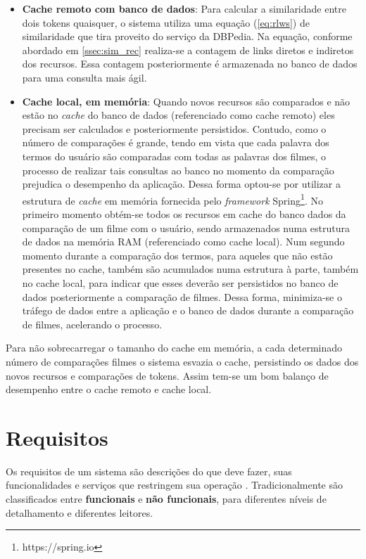 \begin{itemize}
	\item{\textbf{Cache remoto com banco de dados}: Para calcular a similaridade entre dois tokens quaisquer, o sistema utiliza uma equação (\ref{eq:rlws}) de similaridade que tira proveito do serviço da DBPedia. Na equação, conforme abordado em \ref{ssec:sim_rec} realiza-se a contagem de links diretos e indiretos dos recursos. Essa contagem posteriormente é armazenada no banco de dados para uma consulta mais ágil.}
	\item{\textbf{Cache local, em memória}: Quando novos recursos são comparados e não estão no \textit{cache} do banco de dados (referenciado como cache remoto) eles precisam ser calculados e posteriormente persistidos. Contudo, como o número de comparações é grande, tendo em vista que cada palavra dos termos do usuário são comparadas com todas as palavras dos filmes, o processo de realizar tais consultas ao banco no momento da comparação prejudica o desempenho da aplicação. Dessa forma optou-se por utilizar a estrutura de \textit{cache} em memória fornecida pelo \textit{framework} Spring\footnote{https://spring.io}. No primeiro momento obtém-se todos os recursos em cache do banco dados da comparação de um filme com o usuário, sendo armazenados numa estrutura de dados na memória \ac{RAM} (referenciado como cache local). Num segundo momento durante a comparação dos termos, para aqueles que não estão presentes no cache, também são acumulados numa estrutura à parte, também no cache local, para indicar que esses deverão ser persistidos no banco de dados posteriormente a comparação de filmes. Dessa forma, minimiza-se o tráfego de dados entre a aplicação e o banco de dados durante a comparação de filmes, acelerando o processo.}
\end{itemize}
	
Para não sobrecarregar o tamanho do cache em memória, a cada determinado número de comparações filmes o sistema esvazia o cache, persistindo os dados dos novos recursos e comparações de tokens. Assim tem-se um bom balanço de desempenho entre o cache remoto e cache local.

\section{Requisitos}

Os requisitos de um sistema são descrições do que deve fazer, suas funcionalidades e serviços que restringem sua operação \citep{Sommerville2010}. Tradicionalmente são classificados entre \textbf{funcionais} e \textbf{não funcionais}, para diferentes níveis de detalhamento e diferentes leitores.

